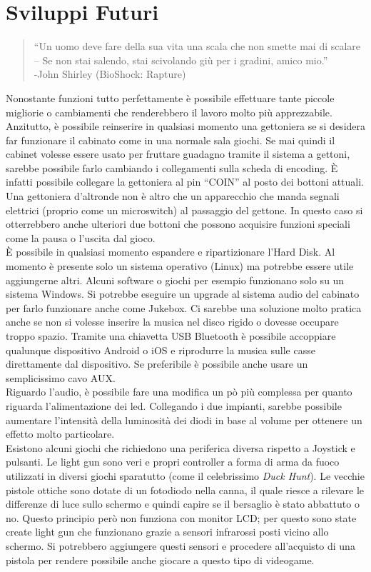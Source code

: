 \section{Sviluppi Futuri}
\begin{quotation}\small
“Un uomo deve fare della sua vita una scala che non smette mai di scalare -- Se non stai salendo, stai scivolando giù per i gradini, amico mio.”\\-John Shirley (BioShock: Rapture)
\end{quotation}
 Nonostante funzioni tutto perfettamente è possibile effettuare tante piccole migliorie o cambiamenti che renderebbero il lavoro molto più apprezzabile. Anzitutto, è possibile reinserire in qualsiasi momento una gettoniera se si desidera far funzionare il cabinato come in una normale sala giochi. Se mai quindi il cabinet volesse essere usato per fruttare guadagno tramite il sistema a gettoni, sarebbe possibile farlo cambiando i collegamenti sulla scheda di encoding. È infatti possibile collegare la gettoniera al pin “COIN” al posto dei bottoni attuali. Una gettoniera d’altronde non è altro che un apparecchio che manda segnali elettrici (proprio come un microswitch) al passaggio del gettone. In questo caso si otterrebbero anche ulteriori due bottoni che possono acquisire funzioni speciali come la pausa o l’uscita dal gioco.\\È possibile in qualsiasi momento espandere e ripartizionare l’Hard Disk. Al momento è presente solo un sistema operativo (Linux) ma potrebbe essere utile aggiungerne altri. Alcuni software o giochi per esempio funzionano solo su un sistema Windows. Si potrebbe eseguire un upgrade al sistema audio del cabinato per farlo funzionare anche come Jukebox. Ci sarebbe una soluzione molto pratica anche se non si volesse inserire la musica nel disco rigido o dovesse occupare troppo spazio. Tramite una chiavetta USB Bluetooth è possibile accoppiare qualunque dispositivo Android o iOS e riprodurre la musica sulle casse direttamente dal dispositivo. Se preferibile è possibile anche usare un semplicissimo cavo AUX.\\
Riguardo l’audio, è possibile fare una modifica un pò più complessa per quanto riguarda l’alimentazione dei led. Collegando i due impianti, sarebbe possibile aumentare l’intensità della luminosità dei diodi in base al volume per ottenere un effetto molto particolare.\\Esistono alcuni giochi che richiedono una periferica diversa rispetto a Joystick e pulsanti. Le light gun sono veri e propri controller a forma di arma da fuoco utilizzati in diversi giochi sparatutto (come il celebrissimo\textit{ Duck Hunt}). Le vecchie pistole ottiche sono dotate di un fotodiodo nella canna, il quale riesce a rilevare le differenze di luce sullo schermo e quindi capire se il bersaglio è stato abbattuto o no. Questo principio però non funziona con monitor LCD; per questo sono state create light gun che funzionano grazie a sensori infrarossi posti vicino allo schermo. Si potrebbero aggiungere questi sensori e procedere all’acquisto di una pistola per rendere possibile anche giocare a questo tipo di videogame.
